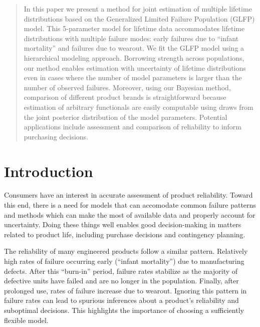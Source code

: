 \documentclass[aoas]{imsart}
\begin{document}
\begin{frontmatter}
\begin{abstract}
In this paper we present a method for joint estimation of multiple lifetime distributions based on the Generalized Limited Failure Population (GLFP) model. This 5-parameter model for lifetime data accommodates lifetime distributions with multiple failure modes:  early failures due to ``infant mortality'' and failures due to wearout. We fit the GLFP model using a hierarchical modeling approach.  Borrowing strength across populations, our method enables estimation with uncertainty of lifetime distributions even in cases where the number of model parameters is larger than the number of observed failures.  Moreover, using our Bayesian method, comparison of different product brands is straightforward because estimation of arbitrary functionals are easily computable using draws from the joint posterior distribution of the model parameters. Potential applications include assessment and comparison of reliability to inform purchasing decisions.

\end{abstract}


\begin{keyword}
\end{keyword}

\end{frontmatter}

\section{Introduction}
Consumers have an interest in accurate assessment of product reliability. Toward this end, there is a need for models that can accomodate common failure patterns and methods which can make the most of available data and properly account for uncertainty. Doing these things well enables good decision-making in matters related to product life, including purchase decisions and contingency planning.

The reliability of many engineered products follow a similar pattern. Relatively high rates of failure occurring early (``infant mortality'') due to manufacturing defects.  After this ``burn-in'' period, failure rates stabilize as the majority of defective units have failed and are no longer in the population.  Finally, after prolonged use, rates of failure increase due to wearout.  Ignoring this pattern in failure rates can lead to spurious inferences about a product's reliability and suboptimal decisions. This highlights the importance of choosing a sufficiently flexible model.
\end{document}
